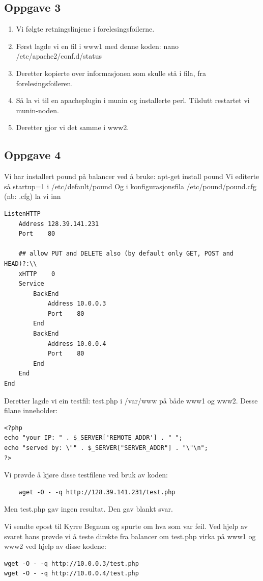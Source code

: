 \documentclass[a4paper, norsk, 12pt]{article}
\begin{document}
\subsection{Oppgave 3}
\begin{enumerate}
\item Vi følgte retningslinjene i forelesingsfoilerne.
\item Først lagde vi en fil i www1 med denne koden: nano /etc/apache2/conf.d/status
\item Deretter kopierte over informasjonen som skulle stå i fila, fra forelesingsfoileren.
\item Så la vi til en apacheplugin i munin og installerte perl. Tilslutt restartet vi munin-noden.
\item Deretter gjor vi det samme i www2.
\end{enumerate}

\subsection{Oppgave 4}
Vi har installert pound på balancer ved å bruke: apt-get install pound
Vi editerte så startup=1 i /etc/default/pound
Og i konfigurasjonsfila /etc/pound/pound.cfg (nb: .cfg) la vi inn

\begin{verbatim}
ListenHTTP
    Address 128.39.141.231
    Port    80

    ## allow PUT and DELETE also (by default only GET, POST and HEAD)?:\\
    xHTTP    0
    Service
        BackEnd
            Address 10.0.0.3
            Port    80
        End
        BackEnd
            Address 10.0.0.4
            Port    80
        End
    End
End
\end{verbatim}

Deretter lagde vi ein testfil: test.php i /var/www på både www1 og www2. Desse filane inneholder:
\begin{verbatim} 
<?php
echo "your IP: " . $_SERVER['REMOTE_ADDR'] . " ";
echo "served by: \"" . $_SERVER["SERVER_ADDR"] . "\"\n";
?>
\end{verbatim}

Vi prøvde å kjøre disse testfilene ved bruk av koden:
\begin{verbatim}
	wget -O - -q http://128.39.141.231/test.php 
\end{verbatim}
Men test.php gav ingen resultat. Den gav blankt svar.

Vi sendte epost til Kyrre Begnum og spurte om hva som var feil. Ved hjelp av svaret hans prøvde vi å teste direkte fra balancer om test.php virka på www1 og www2 ved hjelp av disse kodene:
\begin{verbatim}
wget -O - -q http://10.0.0.3/test.php
wget -O - -q http://10.0.0.4/test.php
\end{verbatim}
\end{document}
